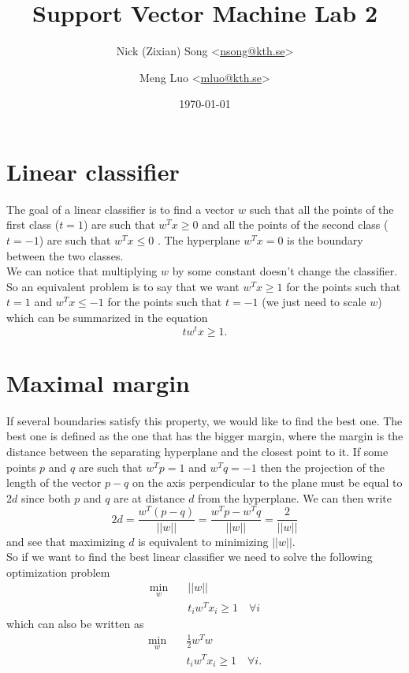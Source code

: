 \documentclass{article}
\title{Support Vector Machine Lab 2}
\author{Nick (Zixian) Song <\href{mailto:nsong@kth.se}{nsong@kth.se}> 
\and Meng Luo <\href{mailto:mluo@kth.se}{mluo@kth.se}>
}
\date{\today}
\begin{document}
\thispagestyle{empty}

\maketitle
\thispagestyle{empty}
\pagestyle{empty}
\newpage
\tableofcontents
\newpage
\pagestyle{fancy}
\setcounter{page}{1}

\section{Linear classifier}
The goal of a linear classifier is to find a vector $w$ such that all the points of the first class ($t = 1$) are such that $w^Tx \geq 0$ and all the points of the second class ($t = -1$) are such that $w^Tx \leq 0$ . The hyperplane $w^Tx = 0$ is the boundary between the two classes.\\

We can notice that multiplying $w$ by some constant doesn't change the classifier. So an equivalent problem is to say that we want $w^Tx \geq 1$ for the points such that $t = 1$ and $w^Tx \leq -1$ for the points such that $t = -1$ (we just need to scale $w$) which can be summarized in the equation $$tw^tx \geq 1.$$ 


\section{Maximal margin}
If several boundaries satisfy this property, we would like to find the best one. The best one is defined as the one that has the bigger margin, where the margin is the distance between the separating hyperplane and the closest point to it. If some points $p$ and $q$ are such that $w^Tp = 1$ and $w^Tq = -1$ then the projection of the length of the vector $p-q$ on the axis perpendicular to the plane must be equal to $2d$ since both $p$ and $q$ are at distance $d$ from the hyperplane. We can then write
$$2d = \frac{w^T(p-q)}{||w||} = \frac{w^Tp-w^Tq}{||w||} = \frac{2}{||w||}$$
and see that maximizing $d$ is equivalent to minimizing $||w||$.\\

So if we want to find the best linear classifier we need to solve the following optimization problem
\begin{align*}
\min_{w}\quad &||w|| \\
&t_iw^Tx_i \geq 1 \quad \forall i
\end{align*}
which can also be written as
\begin{align}
\min_{w}\quad &\frac{1}{2} w^Tw \\
&t_iw^Tx_i \geq 1 \quad \forall i  \nonumber.
\label{primal}
\end{align}
\end{document}
